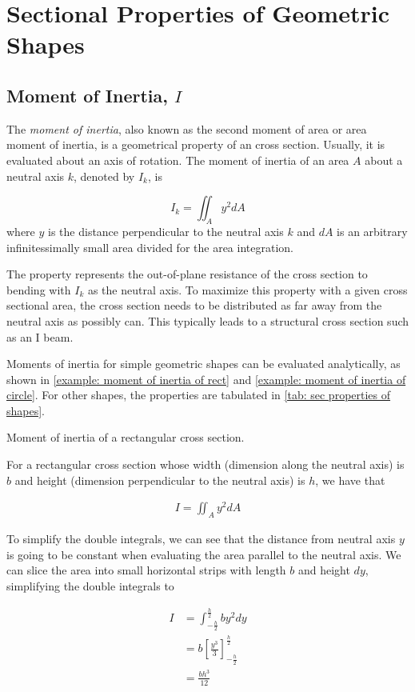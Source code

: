 \documentclass[
10pt,
a4paper,
openany,
svgnames,
]{book}
\begin{document}
\chapter{Sectional Properties of Geometric Shapes} \label{chap: sect props of basic shapes}

\section{Moment of Inertia, $I$}

The \emph{moment of inertia}, also known as the second moment of area or area moment of inertia, is a geometrical property of an cross section. Usually, it is evaluated about an axis of rotation. The moment of inertia of an area $A$ about a neutral axis $k$, denoted by $I_k$, is

\begin{equation}
  I_k = \iint_A y^2 dA
\end{equation} 
where $y$ is the distance perpendicular to the neutral axis $k$ and $dA$ is an arbitrary infinitessimally small area divided for the area integration.

The property represents the out-of-plane resistance of the cross section to bending with $I_k$ as the neutral axis. To maximize this property with a given cross sectional area, the cross section needs to be distributed as far away from the neutral axis as possibly can. This typically leads to a structural cross section such as an I beam.

Moments of inertia for simple geometric shapes can be evaluated analytically, as shown in \cref{example: moment of inertia of rect} and \cref{example: moment of inertia of circle}. For other shapes, the properties are tabulated in \cref{tab: sec properties of shapes}.

\begin{example} \label{example: moment of inertia of rect} Moment of inertia of a rectangular cross section.

  For a rectangular cross section whose width (dimension along the neutral axis) is $b$ and height (dimension perpendicular to the neutral axis) is $h$, we have that

  \begin{align*}
    I = \iint_A y^2 dA
  \end{align*}

  To simplify the double integrals, we can see that the distance from neutral axis $y$ is going to be constant when evaluating the area parallel to the neutral axis. We can slice the area into small horizontal strips with length $b$ and height $dy$, simplifying the double integrals to 

  \begin{align*}
    I &= \int_{-\frac{h}{2}}^{\frac{h}{2}} by^2dy \\
      &= b \left[ \frac{y^3}{3} \right]_{-\frac{h}{2}}^{\frac{h}{2}} \\
      &= \frac{bh^3}{12}
  \end{align*}
  
\end{example}
\end{document}
